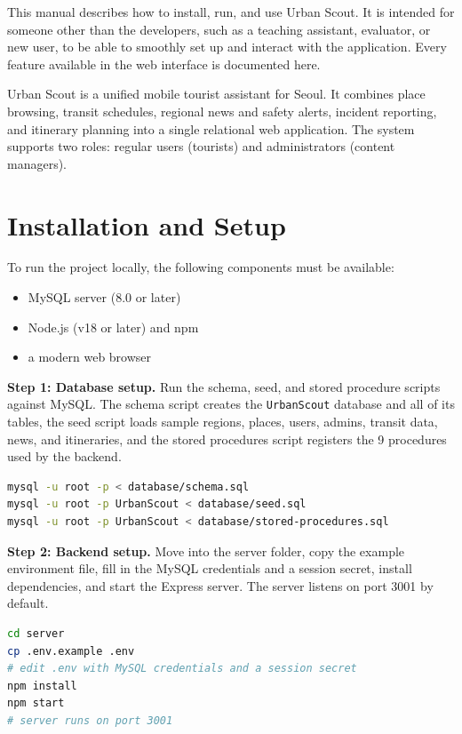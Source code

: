 \documentclass[11pt,letterpaper]{article}
\let\oldtexttt\texttt
\renewcommand{\texttt}[1]{{\color{inlinecode}\oldtexttt{#1}}}
\newcommand{\boldheading}[1]{\needspace{6\baselineskip}\noindent\textbf{#1}}
\begin{document}
This manual describes how to install, run, and use Urban Scout. It is intended for someone other than the developers, such as a teaching assistant, evaluator, or new user, to be able to smoothly set up and interact with the application. Every feature available in the web interface is documented here.

Urban Scout is a unified mobile tourist assistant for Seoul. It combines place browsing, transit schedules, regional news and safety alerts, incident reporting, and itinerary planning into a single relational web application. The system supports two roles: regular users (tourists) and administrators (content managers).

\section{Installation and Setup}

To run the project locally, the following components must be available:
\begin{itemize}
    \item MySQL server (8.0 or later)
    \item Node.js (v18 or later) and npm
    \item a modern web browser
\end{itemize}

\boldheading{Step 1: Database setup.} Run the schema, seed, and stored procedure scripts against MySQL. The schema script creates the \texttt{UrbanScout} database and all of its tables, the seed script loads sample regions, places, users, admins, transit data, news, and itineraries, and the stored procedures script registers the 9 procedures used by the backend.

\begin{lstlisting}[language=Bash]
mysql -u root -p < database/schema.sql
mysql -u root -p UrbanScout < database/seed.sql
mysql -u root -p UrbanScout < database/stored-procedures.sql
\end{lstlisting}

\boldheading{Step 2: Backend setup.} Move into the server folder, copy the example environment file, fill in the MySQL credentials and a session secret, install dependencies, and start the Express server. The server listens on port 3001 by default.

\begin{lstlisting}[language=Bash]
cd server
cp .env.example .env
# edit .env with MySQL credentials and a session secret
npm install
npm start
# server runs on port 3001
\end{lstlisting}
\end{document}
